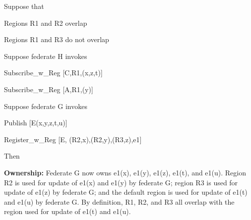 \begin{annexstdpage}
    Suppose that

    \begin{stddashlist}
        \item Regions R1 and R2 overlap
        \item Regions R1 and R3 do not overlap
    \end{stddashlist}

    Suppose federate H invokes

    \begin{stddashlist}
        \item Subscribe\_w\_Reg [C,R1,(x,z,t)]
        \item Subscribe\_w\_Reg [A,R1,(y)]
    \end{stddashlist}

    Suppose federate G invokes

    \begin{stddashlist}
        \item Publish [E(x,y,z,t,u)]
        \item Register\_w\_Reg [E, (R2,x),(R2,y),(R3,z),e1]
    \end{stddashlist}

    Then

    \begin{stddashlist}
        \item \textbf{Ownership:} Federate G now owns e1(x), e1(y), e1(z), e1(t), and e1(u). Region R2 is used for update of e1(x) and e1(y) by federate G; region R3 is used for update of e1(z) by federate G; and the default region is used for update of e1(t) and e1(u) by federate G. By definition, R1, R2, and R3 all overlap with the region used for update of e1(t) and e1(u).
    \end{stddashlist}
\end{annexstdpage}

\clearpage

